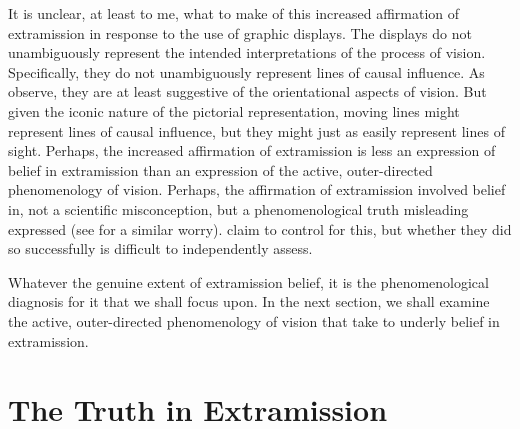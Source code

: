 It is unclear, at least to me, what to make of this increased affirmation of extramission in response to the use of graphic displays. The displays do not unambiguously represent the intended interpretations of the process of vision. Specifically, they do not unambiguously represent lines of causal influence. As \citet{Winer:1996as} observe, they are at least suggestive of the orientational aspects of vision. But given the iconic nature of the pictorial representation, moving lines might represent lines of causal influence, but they might just as easily represent lines of sight. Perhaps, the increased affirmation of extramission is less an expression of belief in extramission than an expression of the active, outer-directed phenomenology of vision. Perhaps, the affirmation of extramission involved belief in, not a scientific misconception, but a phenomenological truth misleading expressed (see \citealt{Robbin:2003xy} for a similar worry). \citet{Winer:1996as} claim to control for this, but whether they did so successfully is difficult to independently assess.

Whatever the genuine extent of extramission belief, it is the phenomenological diagnosis for it that we shall focus upon. In the next section, we shall examine the active, outer-directed phenomenology of vision that \citet{Winer:1996as} take to underly belief in extramission.


\section{The Truth in Extramission} %
\label{sec:the_truth_in_extramission}



